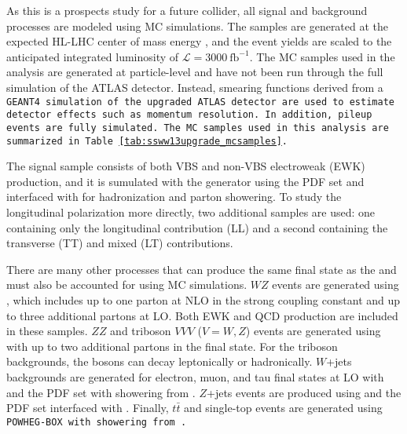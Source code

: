 As this is a prospects study for a future collider, all signal and background processes are modeled using MC simulations.
The samples are generated at the expected HL-LHC center of mass energy , and the event yields are scaled to the anticipated integrated luminosity of $\mathcal{L}=3000~\textrm{fb}^{-1}$.
The MC samples used in the analysis are generated at particle-level and have not been run through the full simulation of the ATLAS detector.
Instead, smearing functions derived from a \tt{GEANT4} simulation of the upgraded ATLAS detector are used to estimate detector effects such as momentum resolution.
In addition, pileup events are fully simulated.
The MC samples used in this analysis are summarized in Table~\ref{tab:ssww13upgrade_mcsamples}.

The signal sample consists of both VBS and non-VBS electroweak (EWK) \ssww production, and it is sumulated with the \mcatnlo generator using the \nnpdf PDF set and interfaced with  \cite{2015.pythia82} for hadronization and parton showering.
To study the longitudinal polarization more directly, two additional \mcatnlo \ssww samples are used: one containing only the longitudinal contribution (LL) and a second containing the transverse (TT) and mixed (LT) contributions.

There are many other processes that can produce the same final state as the \ssww and must also be accounted for using MC simulations.
$WZ$ events are generated using , which includes up to one parton at NLO in the strong coupling constant and up to three additional partons at LO.  
Both EWK and QCD production are included in these samples.
$ZZ$ and triboson $VVV$ ($V = W,Z$) events are generated using  with up to two additional partons in the final state.
For the triboson backgrounds, the bosons can decay leptonically or hadronically.
$W$+jets backgrounds are generated for electron, muon, and tau final states at LO with \mcatnlo and the \nnpdf PDF set with showering from .
$Z$+jets events are produced using  and the \ctten PDF set interfaced with .
Finally, $t\bar{t}$ and single-top events are generated using \tt{POWHEG-BOX} with showering from .


